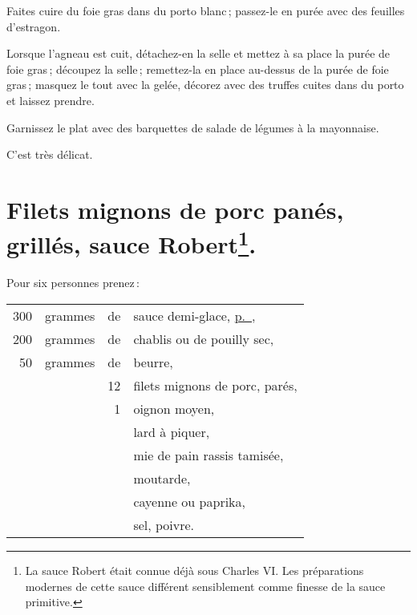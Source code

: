 Faites cuire du foie gras dans du porto blanc ; passez-le en purée avec des
feuilles d'estragon.

Lorsque l'agneau est cuit, détachez-en la selle et mettez à sa place la purée
de foie gras ; découpez la selle ; remettez-la en place au-dessus de la purée
de foie gras ; masquez le tout avec la gelée, décorez avec des truffes cuites
dans du porto et laissez prendre.

Garnissez le plat avec des barquettes de salade de légumes à la mayonnaise.

C'est très délicat.

\section*{\centering Filets mignons de porc panés, grillés, sauce Robert\footnote{La sauce Robert était
                                                 connue déjà sous Charles VI. Les préparations modernes
                                                 de cette sauce différent sensiblement comme finesse de
                                                 la sauce primitive.}.}
{}

Pour six personnes prenez :

\medskip

\footnotesize
\begin{longtable}{rrrp{16em}}
    300 & grammes & de & sauce demi-glace, \hyperlink{p0456}{p. \pageref{pg0456}},                        \\
    200 & grammes & de & chablis ou de pouilly sec,                                                       \\
     50 & grammes & de & beurre,                                                                          \\
        &         & 12 & filets mignons de porc, parés,                                                   \\
        &         &  1 & oignon moyen,                                                                    \\
        &         &    & lard à piquer,                                                                   \\
        &         &    & mie de pain rassis tamisée,                                                      \\
        &         &    & moutarde,                                                                        \\
        &         &    & cayenne ou paprika,                                                              \\
        &         &    & sel, poivre.                                                                     \\
\end{longtable}
\normalsize

